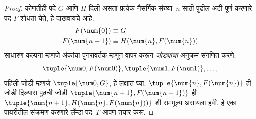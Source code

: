 \begin{proof}
कोणतीही पदे $G$ आणि $H$ दिली असता प्रत्येक नैसर्गिक
संख्या~$n$ साठी पुढील अटी पूर्ण करणारे पद $F$
शोधता येते, हे दाखवायचे आहे:
\begin{align*}
F(\num{0}) & \equiv G \\
F(\num{n+1}) & \equiv H(\num{n}, F(\num{n}))
\end{align*}
साधारण कल्पना म्हणजे अंकांचा पुनरावर्तक म्हणून वापर करून
\emph{जोड्यांचा} अनुक्रम संगणित करणे:
\[\tuple{\num 0, F(\num 0)}, \tuple{\num 1, F(\num 1)}, \dots,
\]
पहिली जोडी म्हणजे $\tuple{\num 0, G}$, हे लक्षात घ्या.
$\tuple{\num{n}, F(\num{n})}$ ही जोडी दिल्यास पुढची जोडी
$\tuple{\num{n+1}, F(\num{n+1})}$ ही
$\tuple{\num{n+1}, H(\num{n}, F(\num{n}))}$ शी
सममूल्य असायला हवी. हे एका पायरीतील संक्रमण करणारे
लॅम्डा पद~$T$ आपण तयार करू.


\end{proof}
